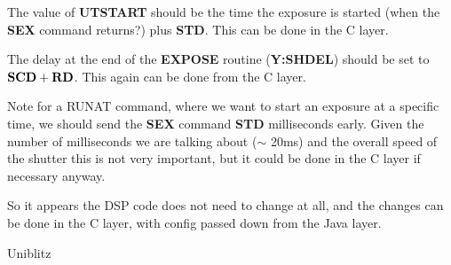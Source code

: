 \documentclass[10pt,a4paper]{article}
\begin{document}
The value of {\bf UTSTART} should be the time the exposure is started (when the {\bf SEX} command returns?)
 plus {\bf STD}. This can be done in the C layer.

The delay at the end of the {\bf EXPOSE} routine ({\bf Y:SHDEL}) should be set to ${\bf SCD} + {\bf RD}$.
This again can be done from the C layer.

Note for a RUNAT command, where we want to start an exposure at a specific time, we should send the
{\bf SEX} command {\bf STD} milliseconds early. Given the number of milliseconds we are talking about ($\sim$ 20ms)
and the overall speed of the shutter this is not very important, but it could be done in the C layer if necessary anyway.

So it appears the DSP code does not need to change at all, and the changes can be done in the C layer, with
config passed down from the Java layer.

\begin{thebibliography}{99}

Uniblitz 

\end{thebibliography}
\end{document}
